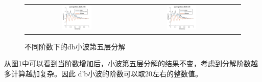 \begin{figure}[!htb]
\begin{tabular}{ccc}
		\includegraphics[width=0.3\textwidth]{thesis_figure/ion_chapter/db25_lvl5}&
		\includegraphics[width=0.3\textwidth]{thesis_figure/ion_chapter/db30_lvl5}
	\end{tabular}
	\caption{\label{fig:dbvar}不同阶数下的db小波第五层分解}
\end{figure}
从图\ref{fig:dbvar}中可以看到当阶数增加后，小波第五层分解的结果不变，考虑到分解阶数越多计算越加复杂。因此
d'b小波的阶数可以取20左右的整数值。

